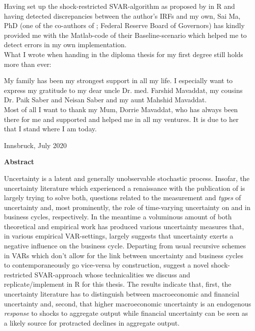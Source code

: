 \documentclass[a4paper,11pt,listof=nochaptergap,oneside,pointednumbers,bibtotoc,bigheadings,liststotoc,hidelinks]{scrbook}
\makeatletter
\theoremstyle{mysatz}
\theoremstyle{mydefinition}
\theoremstyle{mytheorem}
\theoremstyle{mybemerkung}
\newcommand\abstractname{Abstract}  %
\newenvironment{abstract}{%
      \titlepage
      \null\vfil
      \@beginparpenalty\@lowpenalty
      \begin{center}%
        \bfseries \abstractname
        \@endparpenalty\@M
      \end{center}}%
     {\par\vfil\null\endtitlepage}
\newenvironment{abstract}{%
      \if@twocolumn
        \section*{\abstractname}%
      \else
        \small
        \begin{center}%
          {\bfseries \abstractname\vspace{-.5em}\vspace{\z@}}%
        \end{center}%
        \quotation
      \fi}
      {\if@twocolumn\else\endquotation\fi}
\makeatother
\begin{document}
Having set up the shock-restricted SVAR-algorithm as proposed by \citet{ludvigsonetal:18} in R and having detected discrepancies between the author's IRFs and my own, Sai Ma, PhD (one of the co-authors of \citet{ludvigsonetal:18}; Federal Reserve Board of Governors) has kindly provided me with the Matlab-code of their Baseline-scenario which helped me to detect errors in my own implementation.\\

What I wrote when handing in the diploma thesis for my first degree still holds more than ever:

My family has been my strongest support in all my life. I especially want to express my gratitude to my dear uncle Dr. med. Farshid Mavaddat, my cousins Dr. Paik Saber and Neisan Saber and my aunt Mahshid Mavaddat.\\
Most of all I want to thank my Mum, Dorrie Mavaddat, who has always been there for me and supported and helped me in all my ventures. It is due to her that I stand where I am today.
    \begin{flushright}
         Innsbruck, July 2020\\
    \end{flushright}
\vspace*{\fill}
%
\pagestyle{headings}


\thispagestyle{empty} 
\begin{abstract}
Uncertainty is a latent and generally unobservable stochastic process. Insofar, the uncertainty literature which experienced a renaissance with the publication of \citet{bloom:09} is largely trying to solve both, questions related to the measurement and \textit{types} of uncertainty and, most prominently, the role of time-varying uncertainty on and in business cycles, respectively. In the meantime a voluminous amount of both theoretical and empirical work has produced various uncertainty measures that, in various empirical VAR-settings, largely suggests that uncertainty exerts a negative influence on the business cycle. Departing from usual recursive schemes in VARs which don't allow for the link between uncertainty and business cycles to contemporaneously go vice-versa by construction, \citet{ludvigsonetal:18} suggest a novel shock-restricted SVAR-approach whose technicalities we discuss and replicate/implement in R for this thesis. The results indicate that, first, the uncertainty literature has to distinguish between macroeconomic and financial uncertainty and, second, that higher macroeconomic uncertainty is an endogenous \textit{response} to shocks to aggregate output while financial uncertainty can be seen as a likely source for protracted declines in aggregate output.
\end{abstract}
\end{document}
